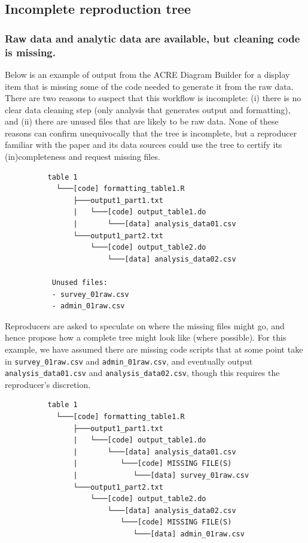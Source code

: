 \documentclass[
]{book}
\begin{document}
\hypertarget{incomplete-reproduction-tree}{%
\subsection{Incomplete reproduction tree}\label{incomplete-reproduction-tree}}

\hypertarget{raw-data-and-analytic-data-are-available-but-cleaning-code-is-missing.}{%
\subsubsection{Raw data and analytic data are available, but cleaning code is missing.}\label{raw-data-and-analytic-data-are-available-but-cleaning-code-is-missing.}}

Below is an example of output from the ACRE Diagram Builder for a display item that is missing some of the code needed to generate it from the raw data. There are two reasons to suspect that this workflow is incomplete: (i) there is no clear data cleaning step (only analysis that generates output and formatting), and (ii) there are unused files that are likely to be raw data. None of these reasons can confirm unequivocally that the tree is incomplete, but a reproducer familiar with the paper and its data sources could use the tree to certify its (in)completeness and request missing files.

\begin{verbatim}
          table 1
            └───[code] formatting_table1.R
                ├───output1_part1.txt  
                |   └───[code] output_table1.do           
                |       └───[data] analysis_data01.csv
                └───output1_part2.txt  
                    └───[code] output_table2.do           
                        └───[data] analysis_data02.csv

           Unused files: 
           - survey_01raw.csv
           - admin_01raw.csv  
\end{verbatim}

Reproducers are asked to speculate on where the missing files might go, and hence propose how a complete tree might look like (where possible). For this example, we have assumed there are missing code scripts that at some point take in \texttt{survey\_01raw.csv} and \texttt{admin\_01raw.csv}, and eventually output \texttt{analysis\_data01.csv} and \texttt{analysis\_data02.csv}, though this requires the reproducer's discretion.

\begin{verbatim}
          table 1
            └───[code] formatting_table1.R
                ├───output1_part1.txt  
                |   └───[code] output_table1.do           
                |       └───[data] analysis_data01.csv
                |          └───[code] MISSING FILE(S)
                |             └───[data] survey_01raw.csv
                └───output1_part2.txt  
                    └───[code] output_table2.do           
                        └───[data] analysis_data02.csv
                           └───[code] MISSING FILE(S)
                              └───[data] admin_01raw.csv  
\end{verbatim}
\end{document}
